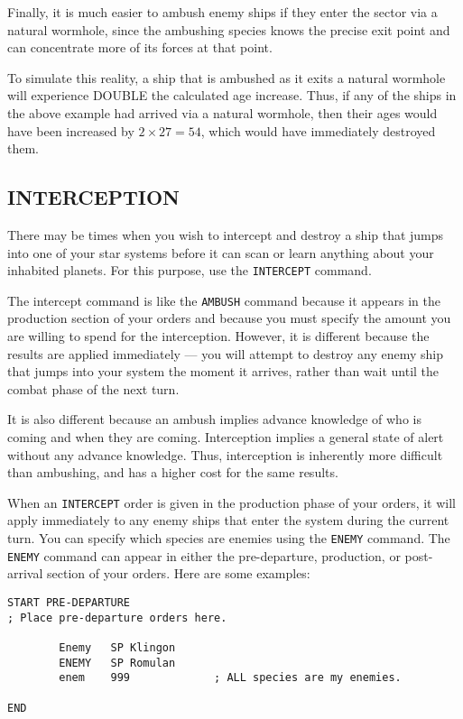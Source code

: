 \documentclass[10pt,titlepage]{article}
\begin{document}
Finally, it is much easier to ambush enemy ships if they enter the sector via a
natural wormhole, since the ambushing species knows the precise exit point and
can concentrate more of its forces at that point.

To simulate this reality, a ship that is ambushed as it exits a natural
wormhole will experience DOUBLE the calculated age increase.  Thus, if any of
the ships in the above example had arrived via a natural wormhole, then their
ages would have been increased by $2 \times 27 = 54$, which would have immediately
destroyed them.


\subsection{INTERCEPTION}
\label{sec:interception}


There may be times when you wish to intercept and destroy a ship that jumps
into one of your star systems before it can scan or learn anything about your
inhabited planets.  For this purpose, use the \texttt{INTERCEPT} command.

The intercept command is like the \texttt{AMBUSH} command because it appears in the
production section of your orders and because you must specify the amount you
are willing to spend for the interception.  However, it is different because
the results are applied immediately --- you will attempt to destroy any enemy
ship that jumps into your system the moment it arrives, rather than wait until
the combat phase of the next turn.

It is also different because an ambush implies advance knowledge of who is
coming and when they are coming.  Interception implies a general state of alert
without any advance knowledge.  Thus, interception is inherently more difficult
than ambushing, and has a higher cost for the same results.

When an \texttt{INTERCEPT} order is given in the production phase of your orders, it
will apply immediately to any enemy ships that enter the system during the
current turn.  You can specify which species are enemies using the \texttt{ENEMY}
command.  The \texttt{ENEMY} command can appear in either the pre-departure, production,
or post-arrival section of your orders.  Here are some examples:

\begin{verbatim}
START PRE-DEPARTURE
; Place pre-departure orders here.

        Enemy   SP Klingon
        ENEMY   SP Romulan
        enem    999             ; ALL species are my enemies.

END\end{verbatim} 
\end{document}
